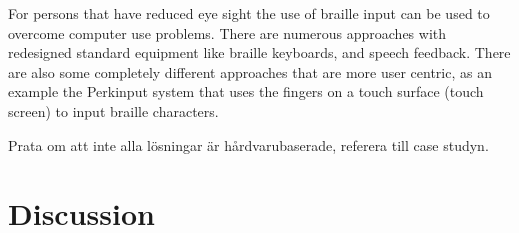For persons that have reduced eye sight the use of braille input can be used to overcome computer use problems. There are numerous approaches with redesigned standard equipment like braille keyboards, and speech feedback. There are also some completely different approaches that are more user centric, as an example the Perkinput system that uses the fingers on a touch surface (touch screen) to input braille characters.

Prata om att inte alla lösningar är hårdvarubaserade, referera till case studyn.

\section{Discussion}

